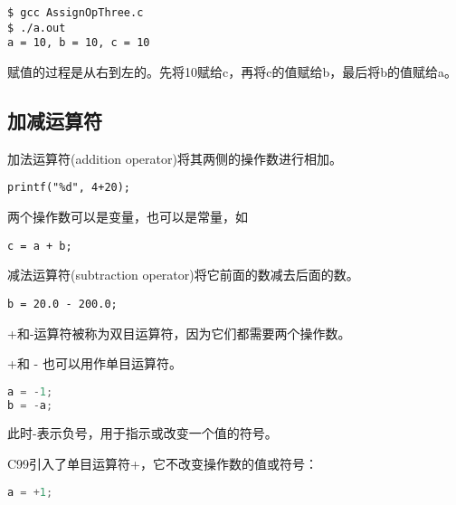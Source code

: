 \begin{frame}[fragile]\ft{\subsecname}

\end{frame}


\begin{frame}[fragile]\ft{\subsecname}
\begin{lstlisting}[backgroundcolor=\color{red!10}]    
$ gcc AssignOpThree.c
$ ./a.out
a = 10, b = 10, c = 10  
\end{lstlisting}
\end{frame}


\begin{frame}[fragile]\ft{\subsecname}
赋值的过程是从右到左的。先将10赋给c，再将c的值赋给b，最后将b的值赋给a。
\end{frame}

\subsection{加减运算符}
\begin{frame}[fragile]\ft{\subsecname}
加法运算符(addition operator)将其两侧的操作数进行相加。 \vspace{1em}

\begin{lstlisting}
printf("%d", 4+20);
\end{lstlisting}
\vspace{1em}

两个操作数可以是变量，也可以是常量，如
\begin{lstlisting}
c = a + b;
\end{lstlisting}
\end{frame}
 
\begin{frame}[fragile]\ft{\subsecname}
减法运算符(subtraction operator)将它前面的数减去后面的数。\vspace{1em}

\begin{lstlisting}
b = 20.0 - 200.0;
\end{lstlisting}
\vspace{1em}

+和-运算符被称为双目运算符，因为它们都需要两个操作数。
\end{frame}


\begin{frame}[fragile]\ft{\subsecname}
\tf +和 - 也可以用作单目运算符。
\vspace{1em}

\begin{lstlisting}[language=c,backgroundcolor=\color{red!10}]
a = -1;
b = -a;
\end{lstlisting}
此时-表示负号，用于指示或改变一个值的符号。
\vspace{1em}

C99引入了单目运算符+，它不改变操作数的值或符号：
\begin{lstlisting}[language=c,backgroundcolor=\color{red!10}]
a = +1;
\end{lstlisting}
\end{frame}

